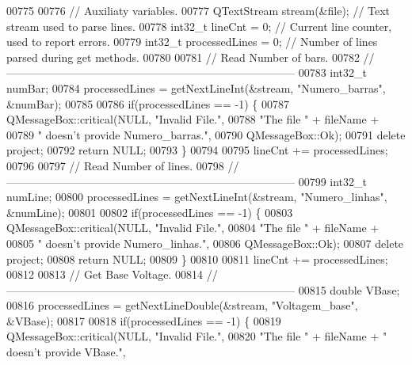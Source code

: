\begin{DoxyCode}
00775 
00776   \textcolor{comment}{// Auxiliaty variables.}
00777   QTextStream stream(&file); \textcolor{comment}{// Text stream used to parse lines.}
00778   int32\_t lineCnt = 0; \textcolor{comment}{// Current line counter, used to report errors.}
00779   int32\_t processedLines = 0; \textcolor{comment}{// Number of lines parsed during get methods.}
00780 
00781 \textcolor{comment}{// Read Number of bars.}
00782 \textcolor{comment}{//------------------------------------------------------------------------------}
00783   int32\_t numBar;
00784   processedLines = getNextLineInt(&stream, \textcolor{stringliteral}{"Numero\_barras"}, &numBar);
00785 
00786   \textcolor{keywordflow}{if}(processedLines == -1) \{
00787     QMessageBox::critical(NULL, \textcolor{stringliteral}{"Invalid File."},
00788                           \textcolor{stringliteral}{"The file "} + fileName +
00789                           \textcolor{stringliteral}{" doesn't provide Numero\_barras."},
00790                           QMessageBox::Ok);
00791     \textcolor{keyword}{delete} project;
00792     \textcolor{keywordflow}{return} NULL;
00793   \}
00794 
00795   lineCnt += processedLines;
00796 
00797 \textcolor{comment}{// Read Number of lines.}
00798 \textcolor{comment}{//------------------------------------------------------------------------------}
00799   int32\_t numLine;
00800   processedLines = getNextLineInt(&stream, \textcolor{stringliteral}{"Numero\_linhas"}, &numLine);
00801 
00802   \textcolor{keywordflow}{if}(processedLines == -1) \{
00803     QMessageBox::critical(NULL, \textcolor{stringliteral}{"Invalid File."},
00804                           \textcolor{stringliteral}{"The file "} + fileName +
00805                           \textcolor{stringliteral}{" doesn't provide Numero\_linhas."},
00806                           QMessageBox::Ok);
00807     \textcolor{keyword}{delete} project;
00808     \textcolor{keywordflow}{return} NULL;
00809   \}
00810 
00811   lineCnt += processedLines;
00812 
00813 \textcolor{comment}{// Get Base Voltage.}
00814 \textcolor{comment}{//------------------------------------------------------------------------------}
00815   \textcolor{keywordtype}{double} VBase;
00816   processedLines = getNextLineDouble(&stream, \textcolor{stringliteral}{"Voltagem\_base"}, &VBase);
00817 
00818   \textcolor{keywordflow}{if}(processedLines == -1) \{
00819     QMessageBox::critical(NULL, \textcolor{stringliteral}{"Invalid File."},
00820                           \textcolor{stringliteral}{"The file "} + fileName + \textcolor{stringliteral}{" doesn't provide VBase."},

\end{DoxyCode}
